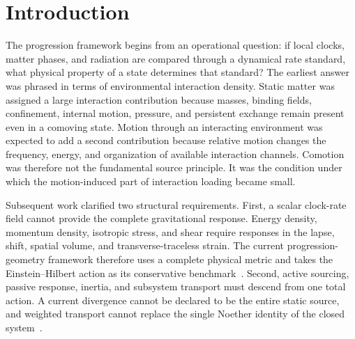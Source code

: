 \documentclass[11pt]{article}
\begin{document}
\begin{abstract}
We derive the static Yukawa response, the low-velocity relative-flow energy, a stress-tensor redundancy test, and the baseline stability conditions.  On a homogeneous comoving background, the common-flow kinetic eigenvalue is unchanged, while the relative-flow eigenvalue is shifted by $2\epsilon$, with
\[
\epsilon=\frac{\kappa_r\mathcal C_0q_Aq_B}{\Lambda_I^4}.
\]
The local no-ghost condition is $w_Aw_B+\epsilon(w_A+w_B)>0$.  Integrating out a massive complexity field produces an attractive static correlation energy; positivity of the resulting compressibility matrix supplies the first nontrivial bound on the static coupling.  We also exhibit two distinct two-stream states with the same total stress tensor but different pairwise relative invariants, showing that constituent interaction organization is not reconstructible from $T^{\mu\nu}$ alone without additional current information.  This is not yet a galaxy model or a proof of new gravity.  It is a covariant source-sector prototype with explicit failure criteria: universal loading, two-stream stability, operator nonredundancy, and observationally acceptable coupling strength must all be demonstrated before phenomenological application.
\end{abstract}

\section{Introduction}

The progression framework begins from an operational question: if local clocks, matter phases, and radiation are compared through a dynamical rate standard, what physical property of a state determines that standard?  The earliest answer was phrased in terms of environmental interaction density.  Static matter was assigned a large interaction contribution because masses, binding fields, confinement, internal motion, pressure, and persistent exchange remain present even in a comoving state.  Motion through an interacting environment was expected to add a second contribution because relative motion changes the frequency, energy, and organization of available interaction channels.  Comotion was therefore not the fundamental source principle.  It was the condition under which the motion-induced part of interaction loading became small.

Subsequent work clarified two structural requirements.  First, a scalar clock-rate field cannot provide the complete gravitational response.  Energy density, momentum density, isotropic stress, and shear require responses in the lapse, shift, spatial volume, and transverse-traceless strain.  The current progression-geometry framework therefore uses a complete physical metric and takes the Einstein--Hilbert action as its conservative benchmark~\cite{JordanGeometry2026}.  Second, active sourcing, passive response, inertia, and subsystem transport must descend from one total action.  A current divergence cannot be declared to be the entire static source, and weighted transport cannot replace the single Noether identity of the closed system~\cite{JordanMatter2026}.
\end{document}
